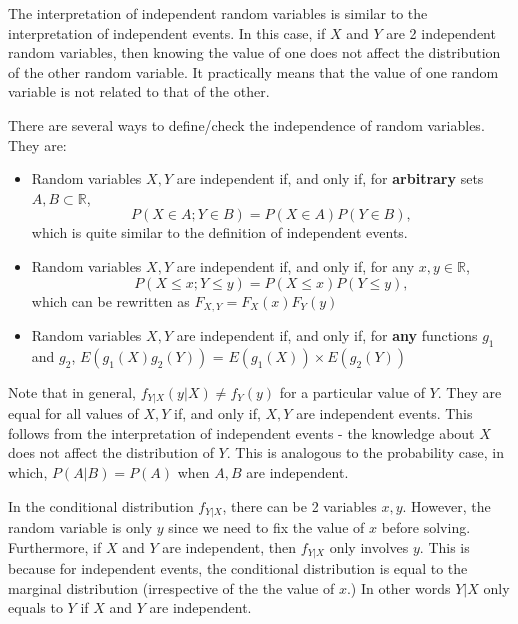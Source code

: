 The interpretation of independent random variables is similar to the interpretation of independent events. In this case, if $X$ and $Y$ are 2 independent random variables, then knowing the value of one does not affect the distribution of the other random variable. It practically means that the value of one random variable is not related to that of the other.

\begin{note}
\end{note}
There are several ways to define/check the independence of random variables. They are:
\begin{itemize}
    \item Random variables $X,Y$ are independent if, and only if, for \textbf{arbitrary} sets $A, B \subset \mathbb{R}$, 
    $$
    P(X \in A; Y \in B) = P(X \in A) P(Y \in B),
    $$ which is quite similar to the definition of independent events.
    \item Random variables $X,Y$ are independent if, and only if, for any $x, y \in \mathbb{R}$,
    $$
    P(X \leq x; Y \leq y) = P(X \leq x) P(Y \leq y),
    $$ which can be rewritten as $F_{X,Y} = F_{X}(x) F_{Y}(y)$
    \item Random variables $X,Y$ are independent if, and only if, for \textbf{any} functions $g_1$ and $g_2$, $E(g_1(X)g_2(Y))$ = $ E(g_1(X)) \times  E(g_2(Y))$
\end{itemize}

\begin{note}
\end{note}
Note that in general, $f_{Y|X}(y|X) \neq f_{Y}(y)$ for a particular value of $Y$. They are equal for all values of $X,Y$ if, and only if, $X,Y$ are independent events. This follows from the interpretation of independent events - the knowledge about $X$ does not affect the distribution of $Y$. This is analogous to the probability case, in which, $P(A|B) = P(A)$ when $A, B$ are independent.

\begin{note}
\end{note}
In the conditional distribution $f_{Y|X}$, there can be 2 variables $x,y$. However, the random variable is only $y$ since we need to fix the value of $x$ before solving. Furthermore, if $X$ and $Y$ are independent, then $f_{Y|X}$ only involves $y$. This is because for independent events, the conditional distribution is equal to the marginal distribution (irrespective of the the value of $x$.) In other words $Y|X$ only equals to $Y$ if $X$ and $Y$ are independent.

